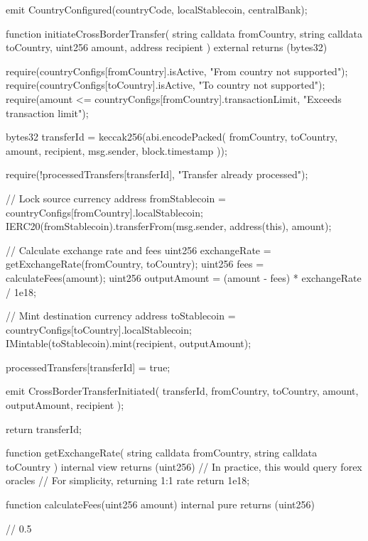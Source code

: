 \documentclass[12pt]{article}
\begin{document}
{{{        emit CountryConfigured(countryCode, localStablecoin, centralBank);    }

    function initiateCrossBorderTransfer(        string calldata fromCountry,        string calldata toCountry,        uint256 amount,        address recipient    ) external returns (bytes32) {        require(countryConfigs[fromCountry].isActive, "From country not supported");        require(countryConfigs[toCountry].isActive, "To country not supported");        require(amount <= countryConfigs[fromCountry].transactionLimit, "Exceeds transaction limit");

        bytes32 transferId = keccak256(abi.encodePacked(            fromCountry,            toCountry,            amount,            recipient,            msg.sender,            block.timestamp        ));

        require(!processedTransfers[transferId], "Transfer already processed");

        // Lock source currency        address fromStablecoin = countryConfigs[fromCountry].localStablecoin;        IERC20(fromStablecoin).transferFrom(msg.sender, address(this), amount);

        // Calculate exchange rate and fees        uint256 exchangeRate = getExchangeRate(fromCountry, toCountry);        uint256 fees = calculateFees(amount);        uint256 outputAmount = (amount - fees) * exchangeRate / 1e18;

        // Mint destination currency        address toStablecoin = countryConfigs[toCountry].localStablecoin;        IMintable(toStablecoin).mint(recipient, outputAmount);

        processedTransfers[transferId] = true;

        emit CrossBorderTransferInitiated(            transferId,            fromCountry,            toCountry,            amount,            outputAmount,            recipient        );

        return transferId;    }

    function getExchangeRate(        string calldata fromCountry,        string calldata toCountry    ) internal view returns (uint256) {        // In practice, this would query forex oracles        // For simplicity, returning 1:1 rate        return 1e18;    }

    function calculateFees(uint256 amount) internal pure returns (uint256) {        // 0.5%

}}}
\end{document}
